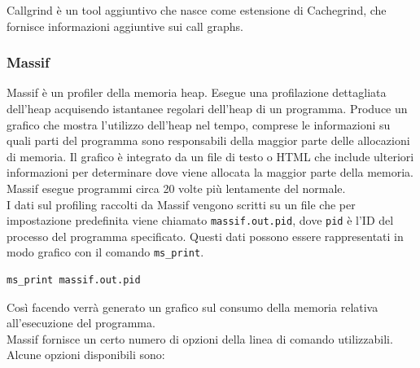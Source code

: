 \documentclass{article}
\begin{document}
Callgrind è un tool aggiuntivo che nasce come estensione di Cachegrind, che
fornisce informazioni aggiuntive sui call graphs.

\subsubsection{Massif}

Massif è un profiler della memoria heap. Esegue una profilazione dettagliata dell'heap
acquisendo istantanee regolari dell'heap di un programma. Produce un grafico che
mostra l'utilizzo dell'heap nel tempo, comprese le informazioni su quali parti
del programma sono responsabili della maggior parte delle allocazioni di
memoria. Il grafico è integrato da un file di testo o HTML che include ulteriori
informazioni per determinare dove viene allocata la maggior parte della memoria.
Massif esegue programmi circa 20 volte più lentamente del normale. \\

I dati sul profiling raccolti da Massif vengono scritti su un file che per
impostazione predefinita viene chiamato \texttt{massif.out.pid}, dove \texttt{pid} è l'ID del processo del programma specificato.
Questi dati possono essere rappresentati in modo grafico con il comando \texttt{ms\_print}.

\begin{lstlisting}[language=bash]
ms_print massif.out.pid
\end{lstlisting}

Così facendo verrà generato un grafico sul consumo della memoria relativa
all'esecuzione del programma. \\

Massif fornisce un certo numero di opzioni della linea di comando utilizzabili.
Alcune opzioni disponibili sono: 
\end{document}
